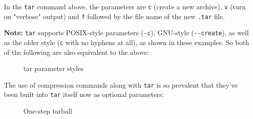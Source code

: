 \documentclass[10pt,american,]{book}
\newenvironment{Shaded}{\begin{snugshade}}{\end{snugshade}}
\newcommand{\KeywordTok}[1]{\textcolor[rgb]{0.13,0.29,0.53}{\textbf{{#1}}}}
\newcommand{\NormalTok}[1]{{#1}}
\numberwithin{figure}{chapter}
\DeclareRobustCommand{\drcap}[1]{\begin{figure}[H]\caption{#1}\end{figure}}
\renewcommand{\KeywordTok}[1]{{#1}}
\renewcommand{\NormalTok}[1]{{#1}}
\begin{document}
\begin{Shaded}
\end{Shaded}

In the \texttt{tar} command above, the parameters are \texttt{c} (create
a new archive), \texttt{v} (turn on "verbose" output) and \texttt{f}
followed by the file name of the new \texttt{.tar} file.

\textbf{Note:} \texttt{tar} supports POSIX-style parameters
(\texttt{-c}), GNU-style (\texttt{-\/-create}), as well as the older
style (\texttt{c} with no hyphens at all), as shown in these examples.
So both of the following are also equivalent to the above:

\drcap{tar parameter styles}

\begin{Shaded}
\end{Shaded}

The use of compression commands along with \texttt{tar} is so prevalent
that they've been built into \texttt{tar} itself now as optional
parameters:

\drcap{One-step tarball}

\begin{Shaded}
\end{Shaded}
\end{document}

